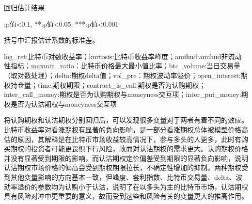 \newpage
{}
\begin{center}
\begin{threeparttable}[H]

\caption{回归估计结果}
\label{call_put_reg}

\begin{tablenotes}
\footnotesize
\item *:p值<0.1, **:p值<0.05, ***:p值<0.001
\item 括号中汇报估计系数的标准差。
\item log\_ret:比特币对数收益率；kurtosis:比特币收益率峰度；amihud:amihud非流动性指标；maxmin\_ratio：比特币价格最大最小值比率；btc\_volume:当日交易量（取对数处理）；delta:期权delta值；vol\_pre：期权波动率溢价；open\_interest:期权持仓量；time:期权期限；contract\_is\_call:期权是否为认购期权；inter\_call\_money:期权是否为认购期权与moneyness交互项；inter\_put\_money:期权是否为认沽期权与moneyness交互项
\end{tablenotes}
\end{threeparttable}
\end{center}
\newpage
\restoregeometry
将认购期权和认沽期权分别回归后，可以发现很多变量对于两者有着不同的效应。比特币收益率对看涨期权有显著的负向影响，是一部分看涨期权总体被模型价格高估的原因，其解释是在比特币市场收益较高情况下，参与多头的人更多，此时有购买期权的投资者可能更畏惧下行风险，故而对认沽期权的需求更大。认购期权价格并没有显著受到期限的影响，而认沽期权定价偏差受到期限的显著负向影响，说明认沽期权市场价格的偏高会受到期权期限拉长，不确定性增加的抑制。两种期权受到其他变量影响的方向基本一致，但峰度、套利指数、比特币交易量、delta、波动率溢价的参数均为认购小于认沽，说明了在以多头为主的比特币市场，认沽期权具有风险对冲中更重要的意义，故而受到这些和风险有关的变量更大的推高作用。